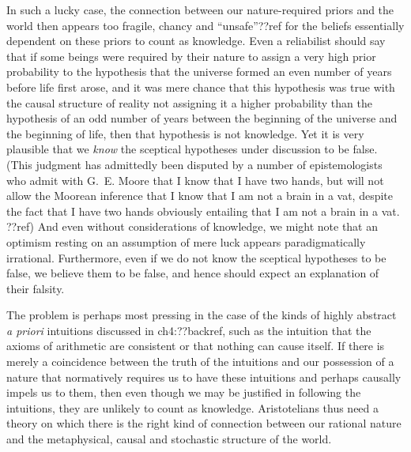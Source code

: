 In such a lucky case, the connection between our nature-required priors and the world then appears too fragile, chancy and ``unsafe''??ref
for the beliefs essentially dependent on these priors to count as knowledge. Even a reliabilist should say that if some beings
were required by their nature to assign a very high prior probability to the hypothesis that the universe formed an even number 
of years before life first arose, and it was mere chance that this hypothesis was true with the causal structure of reality
not assigning it a higher probability than the hypothesis of an odd number of years between the beginning of the universe and
the beginning of life, then that hypothesis is not knowledge. Yet it is very plausible that we \textit{know} the sceptical hypotheses
under discussion to be false. (This judgment has admittedly been disputed by a number of epistemologists who admit with G.~E. Moore that
I know that I have two hands, but will not allow the Moorean inference that I know that I am not a brain in a vat, despite the fact that I have two hands
obviously entailing that I am not a brain in a vat. ??ref) And even without considerations of knowledge, we might note that an optimism
resting on an assumption of mere luck appears paradigmatically irrational. Furthermore, even if we do not know the
sceptical hypotheses to be false, we believe them to be false, and hence should expect an explanation of their falsity.

The problem is perhaps most pressing in the case of the kinds of highly abstract \textit{a priori} intuitions discussed in ch4:??backref,
such as the intuition that the axioms of arithmetic are consistent or that nothing can cause itself. If there is merely a coincidence
between the truth of the intuitions and our possession of  a nature that normatively requires us to have these intuitions and perhaps causally 
impels us to them, then even though we may be justified in following the intuitions, they are unlikely to count as knowledge.
Aristotelians thus need a theory on which there is the right kind of connection between our rational nature and the metaphysical, causal and 
stochastic structure of the world. 


